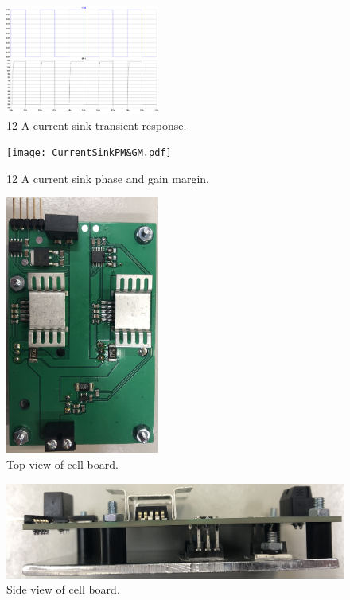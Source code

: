 \begin{figure}[ht!]
    \centering
    \includegraphics[width=0.45\textwidth]{CurrentSinkTransient.pdf}
    \caption{12 A current sink transient response.}
    \label{fig:CurrentSinkTransient}
\end{figure}

\begin{figure}[ht!]
    \centering
    \texttt{[image: CurrentSinkPM\&GM.pdf]}
    \caption{12 A current sink phase and gain margin.}
    \label{fig:CurrentSinkPM&GM}
\end{figure}

\begin{figure}[ht!]
    \centering
    \includegraphics[width=0.45\textwidth]{CellBoardTop.jpg}
    \caption{Top view of cell board.}
    \label{fig:CellBoardTop}
\end{figure}

\begin{figure}[ht!]
    \centering
    \includegraphics[height=0.45\textwidth,angle=90,origin=c]{CellBoardSide.jpg}
    \caption{Side view of cell board.}
    \label{fig:CellBoardSide}
\end{figure}

